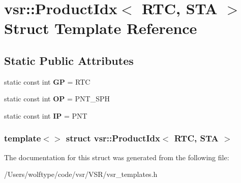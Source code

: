 \hypertarget{structvsr_1_1_product_idx_3_01_r_t_c_00_01_s_t_a_01_4}{\section{vsr\-:\-:Product\-Idx$<$ R\-T\-C, S\-T\-A $>$ Struct Template Reference}
\label{structvsr_1_1_product_idx_3_01_r_t_c_00_01_s_t_a_01_4}
}
\subsection*{Static Public Attributes}
\begin{DoxyCompactItemize}
\item 
\hypertarget{structvsr_1_1_product_idx_3_01_r_t_c_00_01_s_t_a_01_4_a3d2d10dc651c611b99b60dd220ba1320}{static const int {\bfseries G\-P} = R\-T\-C}\label{structvsr_1_1_product_idx_3_01_r_t_c_00_01_s_t_a_01_4_a3d2d10dc651c611b99b60dd220ba1320}

\item 
\hypertarget{structvsr_1_1_product_idx_3_01_r_t_c_00_01_s_t_a_01_4_a6c985f424edd0a61d0530e4f1e710e27}{static const int {\bfseries O\-P} = P\-N\-T\-\_\-\-S\-P\-H}\label{structvsr_1_1_product_idx_3_01_r_t_c_00_01_s_t_a_01_4_a6c985f424edd0a61d0530e4f1e710e27}

\item 
\hypertarget{structvsr_1_1_product_idx_3_01_r_t_c_00_01_s_t_a_01_4_a54ad125c6bcc3498279f49f47d78b1e5}{static const int {\bfseries I\-P} = P\-N\-T}\label{structvsr_1_1_product_idx_3_01_r_t_c_00_01_s_t_a_01_4_a54ad125c6bcc3498279f49f47d78b1e5}

\end{DoxyCompactItemize}
\subsubsection*{template$<$$>$ struct vsr\-::\-Product\-Idx$<$ R\-T\-C, S\-T\-A $>$}



The documentation for this struct was generated from the following file\-:\begin{DoxyCompactItemize}
\item 
/\-Users/wolftype/code/vsr/\-V\-S\-R/vsr\-\_\-templates.\-h\end{DoxyCompactItemize}
